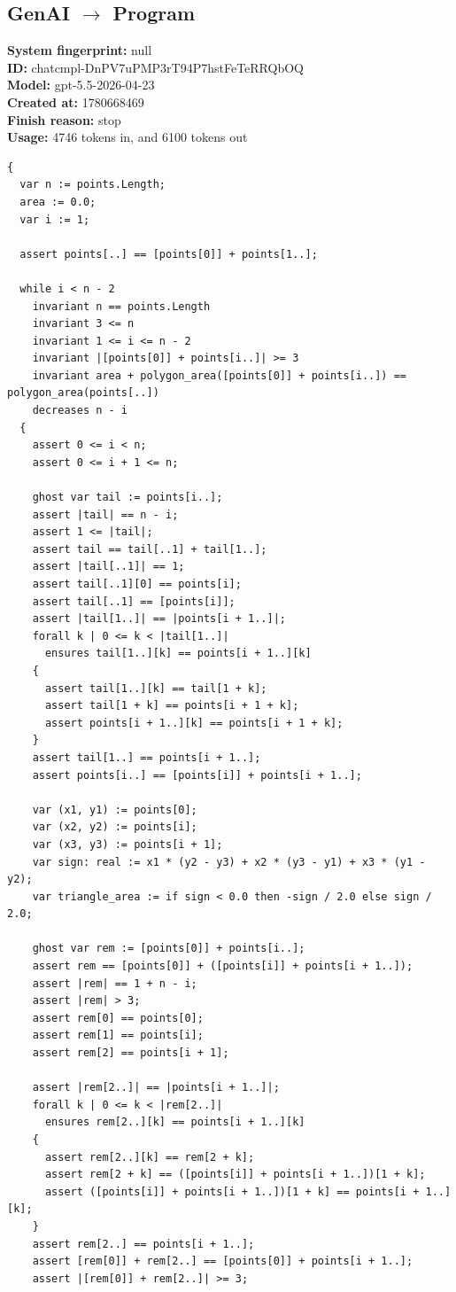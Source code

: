 \documentclass{article}
\begin{document}
\subsection*{GenAI $\rightarrow$ Program}
\textbf{System fingerprint: }null
\\\textbf{ID: }chatcmpl-DnPV7uPMP3rT94P7hstFeTeRRQbOQ
\\\textbf{Model: }gpt-5.5-2026-04-23
\\\textbf{Created at: }1780668469
\\\textbf{Finish reason: }stop
\\\textbf{Usage: }4746 tokens in, and 6100 tokens out
\begin{lstlisting}
{
  var n := points.Length;
  area := 0.0;
  var i := 1;

  assert points[..] == [points[0]] + points[1..];

  while i < n - 2
    invariant n == points.Length
    invariant 3 <= n
    invariant 1 <= i <= n - 2
    invariant |[points[0]] + points[i..]| >= 3
    invariant area + polygon_area([points[0]] + points[i..]) == polygon_area(points[..])
    decreases n - i
  {
    assert 0 <= i < n;
    assert 0 <= i + 1 <= n;

    ghost var tail := points[i..];
    assert |tail| == n - i;
    assert 1 <= |tail|;
    assert tail == tail[..1] + tail[1..];
    assert |tail[..1]| == 1;
    assert tail[..1][0] == points[i];
    assert tail[..1] == [points[i]];
    assert |tail[1..]| == |points[i + 1..]|;
    forall k | 0 <= k < |tail[1..]|
      ensures tail[1..][k] == points[i + 1..][k]
    {
      assert tail[1..][k] == tail[1 + k];
      assert tail[1 + k] == points[i + 1 + k];
      assert points[i + 1..][k] == points[i + 1 + k];
    }
    assert tail[1..] == points[i + 1..];
    assert points[i..] == [points[i]] + points[i + 1..];

    var (x1, y1) := points[0];
    var (x2, y2) := points[i];
    var (x3, y3) := points[i + 1];
    var sign: real := x1 * (y2 - y3) + x2 * (y3 - y1) + x3 * (y1 - y2);
    var triangle_area := if sign < 0.0 then -sign / 2.0 else sign / 2.0;

    ghost var rem := [points[0]] + points[i..];
    assert rem == [points[0]] + ([points[i]] + points[i + 1..]);
    assert |rem| == 1 + n - i;
    assert |rem| > 3;
    assert rem[0] == points[0];
    assert rem[1] == points[i];
    assert rem[2] == points[i + 1];

    assert |rem[2..]| == |points[i + 1..]|;
    forall k | 0 <= k < |rem[2..]|
      ensures rem[2..][k] == points[i + 1..][k]
    {
      assert rem[2..][k] == rem[2 + k];
      assert rem[2 + k] == ([points[i]] + points[i + 1..])[1 + k];
      assert ([points[i]] + points[i + 1..])[1 + k] == points[i + 1..][k];
    }
    assert rem[2..] == points[i + 1..];
    assert [rem[0]] + rem[2..] == [points[0]] + points[i + 1..];
    assert |[rem[0]] + rem[2..]| >= 3;


\end{lstlisting}
\end{document}
